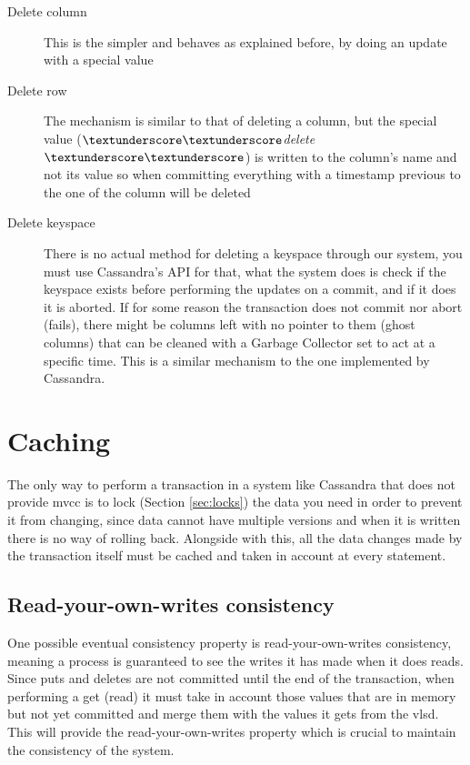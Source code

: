 \begin{description}
	\item[Delete column] This is the simpler and behaves as explained before, by doing an update with a special value
	\item[Delete row] The mechanism is similar to that of deleting a column, but the special value (\emph{$\textunderscore\textunderscore$delete$\textunderscore\textunderscore$}) is written to the column's name and not its value so when committing everything with a timestamp previous to the one of the column will be deleted
	\item[Delete keyspace] There is no actual method for deleting a keyspace through our system, you must use Cassandra's API for that, what the system does is check if the keyspace exists before performing the updates on a commit, and if it does it is aborted. If for some reason the transaction does not commit nor abort (fails), there might be columns left with no pointer to them (ghost columns) that can be cleaned with a Garbage Collector set to act at a specific time. This is a similar mechanism to the one implemented by Cassandra.  
\end{description}

\section{Caching}
The only way to perform a transaction in a system like Cassandra that does not provide \ac{mvcc} is to lock (Section \ref{sec:locks}) the data you need in order to prevent it from changing, since data cannot have multiple versions and when it is written there is no way of rolling back. Alongside with this, all the data changes made by the transaction itself must be cached and taken in account at every statement.

\subsection{Read-your-own-writes consistency}
One possible eventual consistency property is read-your-own-writes consistency, meaning a process is guaranteed to see the writes it has made when it does reads. Since puts and deletes are not committed until the end of the transaction, when performing a get (read) it must take in account those values that are in memory but not yet committed and merge them with the values it gets from the \ac{vlsd}. This will provide the read-your-own-writes property which is crucial to maintain the consistency of the system.


